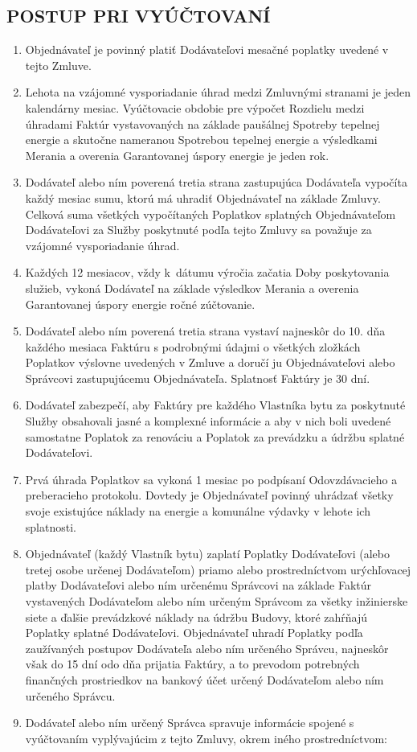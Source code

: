 \begin{multicols}{2}
\subsection{POSTUP PRI VYÚČTOVANÍ}
\begin{enumerate}
\def\labelenumi{\arabic{enumi}.}
\item
  Objednávateľ je povinný platiť Dodávateľovi mesačné poplatky uvedené v
  tejto Zmluve.
\item
  Lehota na vzájomné vysporiadanie úhrad medzi Zmluvnými stranami je
  jeden kalendárny mesiac. Vyúčtovacie obdobie pre výpočet Rozdielu
  medzi úhradami Faktúr vystavovaných na základe paušálnej Spotreby
  tepelnej energie a skutočne nameranou Spotrebou tepelnej energie a
  výsledkami Merania a overenia Garantovanej úspory energie je jeden
  rok.
\item
  Dodávateľ alebo ním poverená tretia strana zastupujúca Dodávateľa
  vypočíta každý mesiac sumu, ktorú má uhradiť Objednávateľ na základe
  Zmluvy. Celková suma všetkých vypočítaných Poplatkov splatných
  Objednávateľom Dodávateľovi za Služby poskytnuté podľa tejto Zmluvy sa
  považuje za vzájomné vysporiadanie úhrad.
\item
  Každých 12 mesiacov, vždy k~dátumu výročia začatia Doby poskytovania
  služieb, vykoná Dodávateľ na základe výsledkov Merania a overenia
  Garantovanej úspory energie ročné zúčtovanie.
\item
  Dodávateľ alebo ním poverená tretia strana vystaví najneskôr do 10.
  dňa každého mesiaca Faktúru s podrobnými údajmi o všetkých zložkách
  Poplatkov výslovne uvedených v Zmluve a doručí ju Objednávateľovi
  alebo Správcovi zastupujúcemu Objednávateľa. Splatnosť Faktúry je 30
  dní.
\item
  Dodávateľ zabezpečí, aby Faktúry pre každého Vlastníka bytu za
  poskytnuté Služby obsahovali jasné a komplexné informácie a aby v nich
  boli uvedené samostatne Poplatok za renováciu a Poplatok za prevádzku
  a údržbu splatné Dodávateľovi.
\item
  Prvá úhrada Poplatkov sa vykoná 1 mesiac po podpísaní Odovzdávacieho a
  preberacieho protokolu. Dovtedy je Objednávateľ povinný uhrádzať
  všetky svoje existujúce náklady na energie a komunálne výdavky v
  lehote ich splatnosti.
\item
  Objednávateľ (každý Vlastník bytu) zaplatí Poplatky Dodávateľovi
  (alebo tretej osobe určenej Dodávateľom) priamo alebo prostredníctvom
  urýchľovacej platby Dodávateľovi alebo ním určenému Správcovi na
  základe Faktúr vystavených Dodávateľom alebo ním určeným Správcom za
  všetky inžinierske siete a ďalšie prevádzkové náklady na údržbu
  Budovy, ktoré zahŕňajú Poplatky splatné Dodávateľovi. Objednávateľ
  uhradí Poplatky podľa zaužívaných postupov Dodávateľa alebo ním
  určeného Správcu, najneskôr však do 15 dní odo dňa prijatia Faktúry, a
  to prevodom potrebných finančných prostriedkov na bankový účet určený
  Dodávateľom alebo ním určeného Správcu.
\item
  Dodávateľ alebo ním určený Správca spravuje informácie spojené s
  vyúčtovaním vyplývajúcim z tejto Zmluvy, okrem iného prostredníctvom:


\end{enumerate}
\end{multicols}
